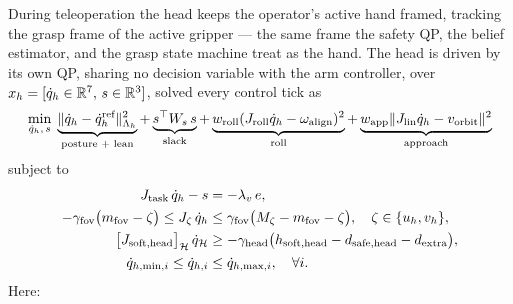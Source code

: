 During teleoperation the head keeps the operator's active hand framed, tracking the grasp frame of the active gripper --- the same frame the safety QP, the belief estimator, and the grasp state machine treat as the hand. The head is driven by its own QP, sharing no decision variable with the arm controller, over $x_h = [\dot{q}_h \in \mathbb{R}^7,\, s \in \mathbb{R}^3]$, solved every control tick as
\begin{equation}
\label{eq:headqp}
\min_{\dot{q}_h,\,s}\;
\underbrace{\|\dot{q}_h-\dot{q}_h^{\text{ref}}\|^2_{\Lambda_h}}_{\text{posture + lean}}
+\underbrace{s^{\top}W_s\,s}_{\text{slack}}
+\underbrace{w_{\text{roll}}(J_{\text{roll}}\dot{q}_h-\omega_{\text{align}})^2}_{\text{roll}}
+\underbrace{w_{\text{app}}\|J_{\text{lin}}\dot{q}_h-v_{\text{orbit}}\|^2}_{\text{approach}}
\end{equation}
subject to
\begin{align}
J_{\text{task}}\,\dot{q}_h - s &= -\lambda_v\, e, \label{eq:headtask}\\
-\gamma_{\text{fov}}\bigl(m_{\text{fov}}-\zeta\bigr) \le J_{\zeta}\,\dot{q}_h &\le \gamma_{\text{fov}}\bigl(M_{\zeta}-m_{\text{fov}}-\zeta\bigr),\quad \zeta \in \{u_h, v_h\}, \label{eq:headfov}\\
\bigl[J_{\text{soft},\text{head}}\bigr]_{\mathcal{H}}\,\dot{q}_{\mathcal{H}} &\ge -\gamma_{\text{head}}\bigl(h_{\text{soft},\text{head}} - d_{\text{safe},\text{head}} - d_{\text{extra}}\bigr), \label{eq:headcbf}\\
\dot{q}_{h,\min,i} \le \dot{q}_{h,i} &\le \dot{q}_{h,\max,i}, \quad \forall i. \label{eq:headjl}
\end{align}
Here:
